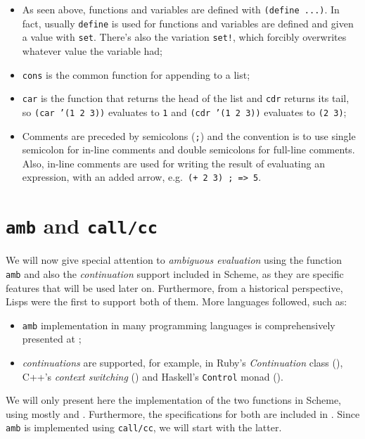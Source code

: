\begin{itemize}
\item As seen above, functions and variables are defined with \texttt{(define ...)}.
  In fact, usually \texttt{define} is used for functions and variables are defined
  and given a value with \texttt{set}. There's also the variation \texttt{set!}, which
  forcibly overwrites whatever value the variable had;
\item \texttt{cons} is the common function for appending to a list;
\item \texttt{car} is the function that returns the head of the list and \texttt{cdr}
  returns its tail, so \texttt{(car '(1 2 3))} evaluates to \texttt{1} and
  \texttt{(cdr '(1 2 3))} evaluates to \texttt{(2 3)};
\item Comments are preceded by semicolons (\texttt{;}) and the convention is to use
  single semicolon for in-line comments and double semicolons for full-line comments.
  Also, in-line comments are used for writing the result of evaluating an expression,
  with an added arrow, e.g.\ \texttt{(+ 2 3) ; => 5}.
\end{itemize}

\section{\texttt{amb} and \texttt{call/cc}}

We will now give special attention to \emph{ambiguous evaluation} using the
function \texttt{amb} and also the \emph{continuation} support included
in Scheme, as they are specific features that will be used later on.
Furthermore, from a historical perspective, Lisps were the first to
support both of them. More languages followed, such as:
\begin{itemize}
\item \texttt{amb} implementation in many programming languages is
  comprehensively presented at \cite{rosetta};
\item \emph{continuations} are supported, for example, in Ruby's
  \emph{Continuation} class (\cite{ruby-callcc}), C++'s \emph{context %
    switching} (\cite{callcc-c}) and Haskell's \texttt{Control} monad
  (\cite{haskell-control}).
\end{itemize}

We will only present here the implementation of the two functions in
Scheme, using mostly \cite{sicp} and \cite{nondet}. Furthermore, the
specifications for both are included in \cite{r7rs}. Since \texttt{amb} is
implemented using \texttt{call/cc}, we will start with the latter.

